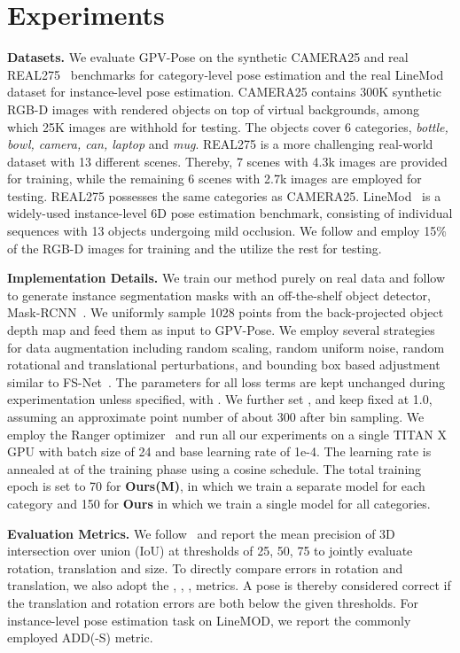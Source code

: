 \documentclass[10pt,twocolumn,letterpaper]{article}
\begin{document}
\section{Experiments}
\textbf{Datasets.}
We evaluate GPV-Pose on the synthetic CAMERA25 and real REAL275~\cite{NOCS} benchmarks for category-level pose estimation and the real LineMod~\cite{Hinterstoisser2012a} dataset for instance-level pose estimation.
CAMERA25 contains 300K synthetic RGB-D images with rendered objects on top of virtual backgrounds, among which 25K images are withhold for testing.
The objects cover 6 categories, \ie \textit{bottle, bowl, camera, can, laptop} and \textit{mug}.
REAL275 is a more challenging real-world dataset with 13 different scenes. Thereby, 7 scenes with 4.3k images are provided for training, while the remaining 6 scenes with 2.7k images are employed for testing. 
REAL275 possesses the same categories as CAMERA25.
LineMod~\cite{Hinterstoisser2012a} is a widely-used instance-level 6D pose estimation benchmark, consisting of individual sequences with 13 objects undergoing mild occlusion.
We follow \cite{GDRN,li2019cdpn} and employ 15\% of the RGB-D images for training and the utilize the rest for testing.

\textbf{Implementation Details.}
We train our method purely on real data and follow~\cite{shape_deform,sgpa} to generate instance segmentation masks with an off-the-shelf object detector, \ie Mask-RCNN~\cite{maskrcnn}.
We uniformly sample 1028 points from the back-projected object depth map and feed them as input to GPV-Pose.
We employ several strategies for data augmentation including random scaling, random uniform noise, random rotational and translational perturbations, and bounding box based adjustment similar to FS-Net~\cite{fs-net}.
The parameters for all loss terms are kept unchanged during experimentation unless specified, with .
We further set ,  and keep  fixed at 1.0, assuming an approximate point number of about 300 after bin sampling.
We employ the Ranger optimizer~\cite{ranger1,ranger2,ranger3} and run all our experiments on a single TITAN X GPU with batch size of 24 and base learning rate of 1e-4.
The learning rate is annealed at  of the training phase using a cosine schedule.
The total training epoch is set to 70 for \textbf{Ours(M)}, in which we train a separate model for each category and 150 for \textbf{Ours} in which we train a single model for all categories.

\textbf{Evaluation Metrics.}
We follow~\cite{NOCS, sgpa, dualposenet} and report the mean precision of 3D intersection over union (IoU) at thresholds of 25, 50, 75 to jointly evaluate rotation, translation and size.
To directly compare errors in rotation and translation, we also adopt the , , ,  metrics. 
A pose is thereby considered correct if the translation and rotation errors are both below the given thresholds.
For instance-level pose estimation task on LineMOD, we report the commonly employed ADD(-S) metric.
\end{document}
